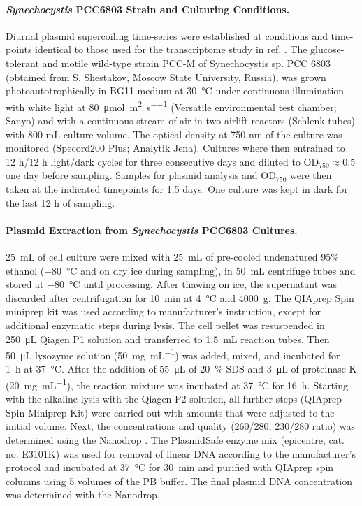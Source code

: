 \documentclass[10pt,letterpaper]{article}
\newcommand{\photons}{\micro\mol\per\square\meter\per\second}
\newcommand{\mL}{\milli\liter}
\newcommand{\scyst}{\textit{Synechocystis} PCC6803}
\newcommand{\OD}{\ensuremath{\text{OD}_{750}}}
\begin{document}
\paragraph{\scyst{} Strain and Culturing Conditions.}
Diurnal plasmid supercoiling time-series were established at
conditions and time-points identical to those used for the
transcriptome study in ref. \cite{Lehmann2013, Beck2014}.  The
glucose-tolerant and motile wild-type strain PCC-M of Synechocystis
sp. PCC 6803 (obtained from S.  Shestakov, Moscow State University,
Russia), was grown photoautotrophically in BG11-medium at
\SI{30}{\celsius} under continuous illumination with white light at
\SI{80}{\photons} (Versatile environmental test chamber; Sanyo) and
with a continuous stream of air in two airlift reactors (Schlenk
tubes) with 800 mL culture volume.  The optical density at 750 nm of
the culture was monitored (Specord200 Plus; Analytik Jena). Cultures
where then entrained to 12 h/12 h light/dark cycles for three
consecutive days and diluted to $\OD{}\approx 0.5$ one day before
sampling. Samples for plasmid analysis and \OD{} were then taken at
the indicated timepoints for 1.5 days. One culture was kept in dark
for the last 12 h of sampling.

\paragraph{Plasmid Extraction from \scyst{} Cultures.}
\SI{25}{\mL} of cell culture were mixed with \SI{25}{\mL} of
pre-cooled undenatured 95\% ethanol (\SI{-80}{\celsius} and on dry ice
during sampling), in \SI{50}{\mL} centrifuge tubes and stored at
\SI{-80}{\celsius} until processing. After thawing on ice, the
supernatant was discarded after centrifugation for \SI{10}{\minute} at
\SI{4}{\celsius} and \SI{4000}{g}. The QIAprep Spin miniprep kit was
used according to manufacturer's instruction, except for additional
enzymatic steps during lysis. The cell pellet was resuspended in
\SI{250}{\micro\liter} Qiagen P1 solution and transferred to
\SI{1.5}{\mL} reaction tubes. Then \SI{50}{\micro\liter} lysozyme 
solution (\SI{50}{\milli\gram\per\milli\liter}) was added, mixed, and
incubated for \SI{1}{\hour} at \SI{37}{\celsius}.  After the addition
of \SI{55}{\micro\liter} of \SI{20}{\percent} SDS and
\SI{3}{\micro\liter} of proteinase K
(\SI{20}{\milli\gram\per\milli\liter}), the reaction mixture was
incubated at \SI{37}{\celsius} for \SI{16}{\hour}.  Starting with the
alkaline lysis with the Qiagen P2 solution, all further steps
(QIAprep Spin Miniprep Kit) were carried out with
amounts that were adjusted to the initial volume. Next, the
concentrations and quality (260/280, 230/280 ratio) was determined
using the Nanodrop  .  The PlasmidSafe enzyme mix (epicentre,
cat. no. E3101K) was used for removal of linear DNA according to the
manufacturer's protocol and incubated at \SI{37}{\celsius} for
\SI{30}{\minute} and purified with QIAprep spin columns using 5
volumes of the PB buffer. The final plasmid DNA concentration was
determined with the Nanodrop.
\end{document}
